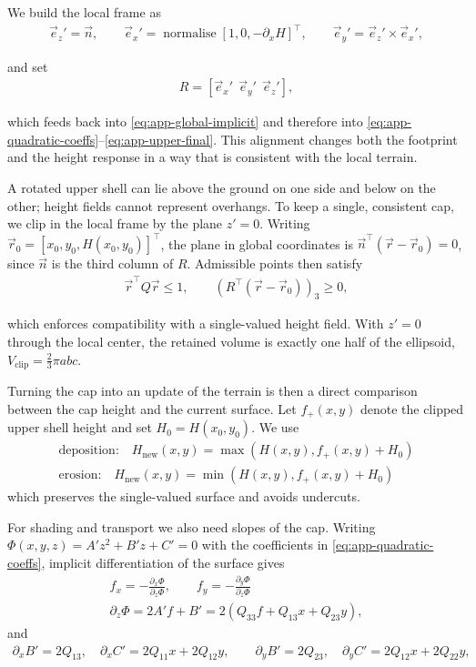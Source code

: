 We build the local frame as
\begin{align}
    \vec e_z'=\vec n,
    \qquad
    \vec e_x'=\operatorname{normalise} [1,0,-\partial_x H]^\top ,
    \qquad
    \vec e_y'=\vec e_z'\times \vec e_x',
\end{align}

and set
\begin{align}
    \label{eq:app-rotation-from-normal}
    R=[ \vec e_x'\ \ \vec e_y'\ \ \vec e_z' ],
\end{align}

which feeds back into \cref{eq:app-global-implicit} and therefore into \cref{eq:app-quadratic-coeffs}–\cref{eq:app-upper-final}. This alignment changes both the footprint and the height response in a way that is consistent with the local terrain.

A rotated upper shell can lie above the ground on one side and below on the other; height fields cannot represent overhangs. To keep a single, consistent cap, we clip in the local frame by the plane $z'=0$. Writing $\vec r_0=[x_0,y_0,H(x_0,y_0)]^\top $, the plane in global coordinates is $\vec n^\top (\vec r-\vec r_0)=0$, since $\vec n$ is the third column of $R$. Admissible points then satisfy
\begin{align}
    \vec r^\top Q\vec r \le 1,
    \qquad
    \left(R^\top (\vec r-\vec r_0)\right)_3 \ge 0,
\end{align}

which enforces compatibility with a single-valued height field. With $z'=0$ through the local center, the retained volume is exactly one half of the ellipsoid, $V_{\text{clip}}=\tfrac{2}{3}\pi abc$.

Turning the cap into an update of the terrain is then a direct comparison between the cap height and the current surface. Let $f_{+}(x,y)$ denote the clipped upper shell height and set $H_0=H(x_0,y_0)$. We use
\begin{align}
    \text{deposition:} \quad H_{\text{new}}(x,y)=\max\left(H(x,y), f_{+}(x,y)+H_0\right) \\
    \text{erosion:}\quad H_{\text{new}}(x,y)=\min\left(H(x,y), f_{+}(x,y)+H_0\right)
\end{align}
which preserves the single-valued surface and avoids undercuts.

For shading and transport we also need slopes of the cap. Writing $\Phi(x,y,z)=A'z^2+B'z+C'=0$ with the coefficients in \cref{eq:app-quadratic-coeffs}, implicit differentiation of the surface gives
\begin{align}
    f_x=-\frac{\partial_x\Phi}{\partial_z\Phi},
    \qquad
    f_y=-\frac{\partial_y\Phi}{\partial_z\Phi} \\
    \partial_z\Phi=2A' f + B' = 2\left(Q_{33} f + Q_{13}x + Q_{23}y\right),
\end{align}
and
\begin{align}
    \partial_x B'=2Q_{13},\quad
    \partial_x C'=2Q_{11}x+2Q_{12}y,
    \qquad
    \partial_y B'=2Q_{23},\quad
    \partial_y C'=2Q_{12}x+2Q_{22}y,
\end{align}


